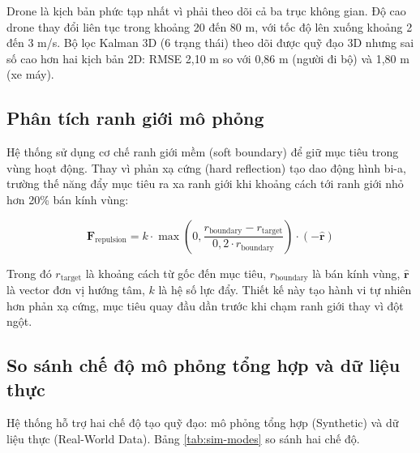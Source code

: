 Drone là kịch bản phức tạp nhất vì phải theo dõi cả ba trục không gian. Độ cao drone thay đổi liên tục trong khoảng 20 đến 80 m, với tốc độ lên xuống khoảng 2 đến 3 m/s. Bộ lọc Kalman 3D (6 trạng thái) theo dõi được quỹ đạo 3D nhưng sai số cao hơn hai kịch bản 2D: RMSE 2,10 m so với 0,86 m (người đi bộ) và 1,80 m (xe máy).

\subsection{Phân tích ranh giới mô phỏng}

\hspace{0.5cm} Hệ thống sử dụng cơ chế ranh giới mềm (soft boundary) để giữ mục tiêu trong vùng hoạt động. Thay vì phản xạ cứng (hard reflection) tạo dao động hình bi-a, trường thế năng đẩy mục tiêu ra xa ranh giới khi khoảng cách tới ranh giới nhỏ hơn 20\% bán kính vùng:

\begin{equation}
\mathbf{F}_{\text{repulsion}} = k \cdot \max\left(0, \frac{r_{\text{boundary}} - r_{\text{target}}}{0{,}2 \cdot r_{\text{boundary}}}\right) \cdot (-\hat{\mathbf{r}})
\end{equation}

Trong đó $r_{\text{target}}$ là khoảng cách từ gốc đến mục tiêu, $r_{\text{boundary}}$ là bán kính vùng, $\hat{\mathbf{r}}$ là vector đơn vị hướng tâm, $k$ là hệ số lực đẩy. Thiết kế này tạo hành vi tự nhiên hơn phản xạ cứng, mục tiêu quay đầu dần trước khi chạm ranh giới thay vì đột ngột.

\subsection{So sánh chế độ mô phỏng tổng hợp và dữ liệu thực}

\hspace{0.5cm} Hệ thống hỗ trợ hai chế độ tạo quỹ đạo: mô phỏng tổng hợp (Synthetic) và dữ liệu thực (Real-World Data). Bảng \ref{tab:sim-modes} so sánh hai chế độ.

\begin{table}[H]
\centering
\caption{So sánh hai chế độ tạo quỹ đạo}
\label{tab:sim-modes}
\end{table}

